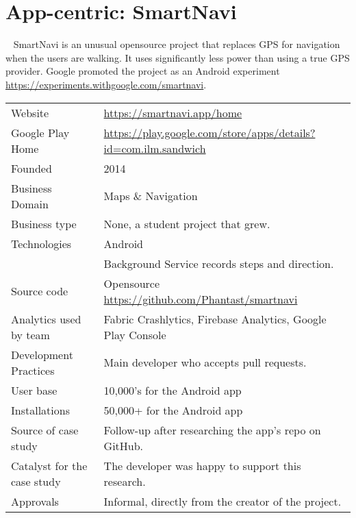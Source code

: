 

\section{App-centric: SmartNavi}~\label{case-study-overview-smartnavi}
SmartNavi is an unusual opensource project that replaces GPS for navigation when the users are walking. It uses significantly less power than using a true GPS provider. Google promoted the project as an Android experiment \url{https://experiments.withgoogle.com/smartnavi}.

{\renewcommand{\arraystretch}{0.8}%
\begin{table*}[h]
    \centering
    \small
    \setlength{\tabcolsep}{6pt}
    \begin{tabular}{lp{9cm}}
       \toprule
       Website &\url{https://smartnavi.app/home} \\
       Google Play Home & \url{https://play.google.com/store/apps/details?id=com.ilm.sandwich} \\
       Founded & 2014 \\
       Business Domain & Maps \& Navigation \\
       Business type & None, a student project that grew. \\
       Technologies  & Android \\
       & Background Service records steps and direction. \\
       Source code  & Opensource \url{https://github.com/Phantast/smartnavi} \\
       Analytics used by team & Fabric Crashlytics, Firebase Analytics, Google Play Console \\
       Development Practices & Main developer who accepts pull requests. \\
       \midrule
       User base & 10,000's for the Android app \\
       Installations & 50,000+ for the Android app \\
       \midrule
       Source of case study &Follow-up after researching the app's repo on GitHub. \\
       Catalyst for the case study & The developer was happy to support this research. \\
       Approvals &Informal, directly from the creator of the project. \\

\end{tabular}
\end{table*}}
